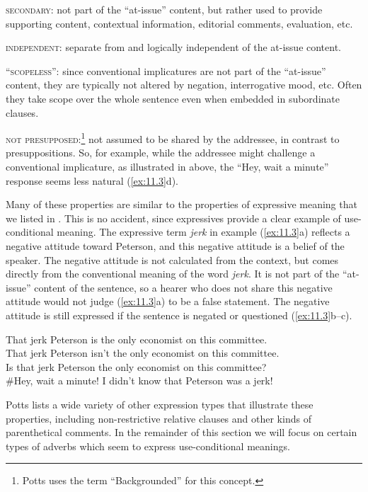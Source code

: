 \textsc{secondary}: not part of the “at-issue” content, but rather used to provide supporting content, contextual information, editorial comments, evaluation, etc.



\textsc{independent}: separate from and logically independent of the at-issue content.



\textsc{“scopeless”:} since conventional implicatures are not part of the “at-issue” content, they are typically not altered by negation, interrogative mood, etc. Often they take scope over the whole sentence even when embedded in subordinate clauses.



\textsc{not presupposed:}\footnote{Potts uses the term “Backgrounded” for this concept.} not assumed to be shared by the addressee, in contrast to presuppositions. So, for example, while the addressee might challenge a conventional implicature, as illustrated in  above, the “Hey, wait a minute” response seems less natural (\ref{ex:11.3}d).



Many of these properties are similar to the properties of expressive meaning that we listed in . This is no accident, since expressives provide a clear example of use-conditional meaning. The expressive term \textit{jerk} in example (\ref{ex:11.3}a) reflects a negative attitude toward Peterson, and this negative attitude is a belief of the speaker. The negative attitude is not calculated from the context, but comes directly from the conventional meaning of the word \textit{jerk}. It is not part of the “at-issue” content of the sentence, so a hearer who does not share this negative attitude would not judge (\ref{ex:11.3}a) to be a false statement. The negative attitude is still expressed if the sentence is negated or questioned (\ref{ex:11.3}b--c).


\ea \label{ex:11.3}
\ea That jerk Peterson is the only economist on this committee.\\
\ex That jerk Peterson isn’t the only economist on this committee.\\
\ex Is that jerk Peterson the only economist on this committee?\\
\ex \#Hey, wait a minute! I didn’t know that Peterson was a jerk!
                       \z
\z


Potts lists a wide variety of other expression types that illustrate these properties, including non-restrictive relative clauses and other kinds of parenthetical comments. In the remainder of this section we will focus on certain types of adverbs which seem to express use-conditional meanings.


